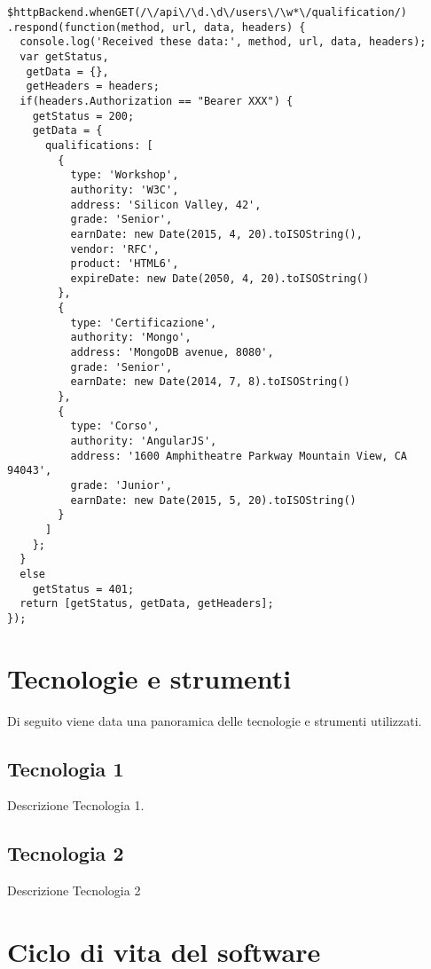 \begin{verbatim}
$httpBackend.whenGET(/\/api\/\d.\d\/users\/\w*\/qualification/)
.respond(function(method, url, data, headers) {
  console.log('Received these data:', method, url, data, headers);
  var getStatus,
   getData = {},
   getHeaders = headers;
  if(headers.Authorization == "Bearer XXX") {
    getStatus = 200;
    getData = {
      qualifications: [
        {
          type: 'Workshop',
          authority: 'W3C',
          address: 'Silicon Valley, 42',
          grade: 'Senior',
          earnDate: new Date(2015, 4, 20).toISOString(),
          vendor: 'RFC',
          product: 'HTML6',
          expireDate: new Date(2050, 4, 20).toISOString()
        },
        {
          type: 'Certificazione',
          authority: 'Mongo',
          address: 'MongoDB avenue, 8080',
          grade: 'Senior',
          earnDate: new Date(2014, 7, 8).toISOString()
        },
        {
          type: 'Corso',
          authority: 'AngularJS',
          address: '1600 Amphitheatre Parkway Mountain View, CA 94043',
          grade: 'Junior',
          earnDate: new Date(2015, 5, 20).toISOString()
        }
      ]
    };
  }
  else
    getStatus = 401;
  return [getStatus, getData, getHeaders];
});
\end{verbatim} 


\section{Tecnologie e strumenti}
\label{sec:tecnologie-strumenti}

Di seguito viene data una panoramica delle tecnologie e strumenti utilizzati.

\subsection*{Tecnologia 1}
Descrizione Tecnologia 1.

\subsection*{Tecnologia 2}
Descrizione Tecnologia 2

\section{Ciclo di vita del software}
\label{sec:ciclo-vita-software}

